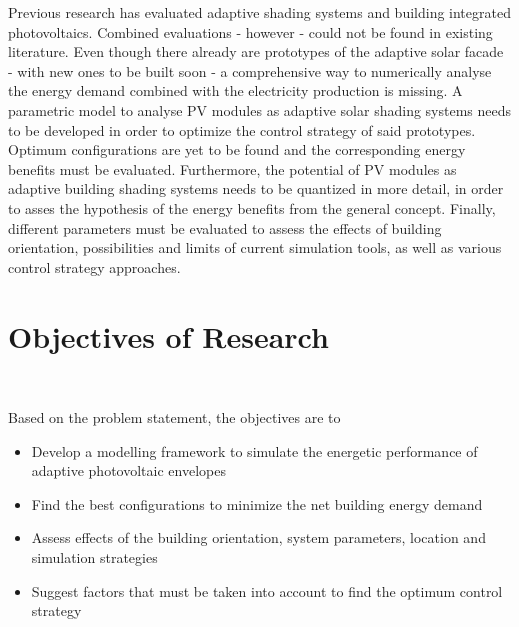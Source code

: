 	Previous research has evaluated adaptive shading systems and building integrated photovoltaics. Combined evaluations - however - could not be found in existing literature. Even though there already are prototypes of the adaptive solar facade - with new ones to be built soon - a comprehensive way to numerically analyse the energy demand combined with the electricity production is missing. A parametric model to analyse PV modules as adaptive solar shading systems needs to be developed in order to optimize the control strategy of said prototypes. Optimum configurations are yet to be found and the corresponding energy benefits must be evaluated. Furthermore, the potential of PV modules as adaptive building shading systems needs to be quantized in more detail, in order to asses the hypothesis of the energy benefits from the general concept. Finally, different parameters must be evaluated to assess the effects of building orientation, possibilities and limits of current simulation tools, as well as various control strategy approaches.




\section{Objectives of Research}\

	Based on the problem statement, the objectives are to

	\begin{itemize}
		\item Develop a modelling framework to simulate the energetic performance of adaptive photovoltaic envelopes
		\item Find the best configurations to minimize the net building energy demand
		\item Assess effects of the building orientation, system parameters, location and simulation strategies
		\item Suggest factors that must be taken into account to find the optimum control strategy
	\end{itemize}


